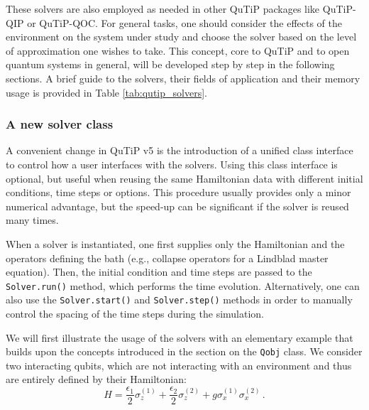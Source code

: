 \documentclass[preprint,3p,sort&compress]{elsarticle}
\def\code#1{\texttt{#1}}
\begin{document}
These solvers are also employed as needed in other QuTiP packages like QuTiP-QIP or QuTiP-QOC. For general tasks, one should consider the effects of the environment on the system under study and choose the solver based on the level of approximation one wishes to take. This concept, core to QuTiP and to open quantum systems in general, will be developed step by step in the following sections. A brief guide to the solvers, their fields of application and their memory usage is provided in Table \ref{tab:qutip_solvers}.






\subsubsection{A new solver class}

A convenient change in QuTiP v5 is the introduction of a unified class interface to control how a user interfaces with the solvers.  Using this class interface is optional, but useful when reusing the same Hamiltonian data with different initial conditions, time steps or options.  This procedure usually provides only a minor numerical advantage, but the speed-up can be significant if the solver is reused many times.

When a solver is instantiated, one first supplies only the Hamiltonian and the operators defining the bath (e.g., collapse operators for a Lindblad master equation). Then, the initial condition and time steps are passed to the \code{Solver.run()} method, which performs the time evolution. Alternatively, one can also use the \code{Solver.start()} and \code{Solver.step()} methods in order to manually control the spacing of the time steps during the simulation.

We will first illustrate the usage of the solvers with an elementary example that builds upon the concepts introduced in the section on the \code{Qobj} class. We consider two interacting qubits, which are not interacting with an environment and thus are entirely defined by their Hamiltonian:
\begin{equation}
 H = \frac{\epsilon_1}{2} \sigma_z^{(1)}+ \frac{\epsilon_2}{2} \sigma_z^{(2)} +g \sigma_x^{(1)} \sigma_x^{(2)}  \, .
 \label{H0}
\end{equation}
\newpage
 
\end{document}
